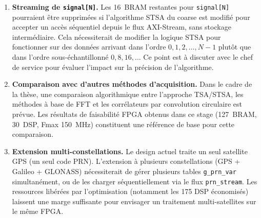 \documentclass[11pt,a4paper]{article}
\begin{document}
\begin{enumerate}
\begin{lstlisting}[numbers=none]
// Propose (fenetre adaptative) :
int fine_tau_begin = max(0, coarse_phase - FINE_TAU_WINDOW/2);
int fine_tau_count = FINE_TAU_WINDOW;  // ex: 128 phases
    \end{lstlisting}
    permettrait de réduire de $\times8$ le nombre de corrélations en fine search ($1023 \to 128$~phases), avec un impact direct sur la latence totale de traitement par fenêtre de 1~ms. En reprenant le circuit fixe \texttt{unified\_corr\_one\_doppler} (Section~\ref{sec:axe2}), dont le nombre de tuiles traitées est directement proportionnel à \texttt{fine\_tau\_count}, ce changement se traduit par une réduction équivalente du nombre d'appels dans \texttt{fine\_pilot()}~: à \texttt{CORR\_TILE=4} inchangé, le nombre de tuiles par bin Doppler fin passerait de 256 à 32, réduisant d'autant la latence de cette étape sans toucher aux ressources BRAM/DSP déjà optimisées. Une estimation prudente, à latence par tuile inchangée, suggère un gain de l'ordre de $\times6$ à $\times8$ sur la latence totale de \texttt{fine\_pilot()}, à confirmer par une nouvelle campagne de synthèse une fois la fenêtre adaptative implémentée et le calcul de la position \texttt{coarse\_phase} correctement propagé entre les deux pilotes.

  \item \textbf{Streaming de \texttt{signal[N]}.} Les 16~BRAM restantes pour \texttt{signal[N]} pourraient être supprimées si l'algorithme STSA du coarse est modifié pour accepter un accès séquentiel depuis le flux AXI-Stream, sans stockage intermédiaire. Cela nécessiterait de modifier la logique STSA pour fonctionner sur des données arrivant dans l'ordre $0, 1, 2, \ldots, N-1$ plutôt que dans l'ordre sous-échantillonné $0, 8, 16, \ldots$ Ce point est à discuter avec le chef de service pour évaluer l'impact sur la précision de l'algorithme.

  \item \textbf{Comparaison avec d'autres méthodes d'acquisition.} Dans le cadre de la thèse, une comparaison algorithmique entre l'approche TSA/STSA, les méthodes à base de FFT et les corrélateurs par convolution circulaire est prévue. Les résultats de faisabilité FPGA obtenus dans ce stage (127~BRAM, 30~DSP, Fmax 150~MHz) constituent une référence de base pour cette comparaison.

  \item \textbf{Extension multi-constellations.} Le design actuel traite un seul satellite GPS (un seul code PRN). L'extension à plusieurs constellations (GPS + Galileo + GLONASS) nécessiterait de gérer plusieurs tables \texttt{g\_prn\_var} simultanément, ou de les charger séquentiellement via le flux \texttt{prn\_stream}. Les ressources libérées par l'optimisation (notamment les 175 DSP économisés) laissent une marge suffisante pour envisager un traitement multi-satellites sur le même FPGA.
\end{enumerate}
\end{document}
